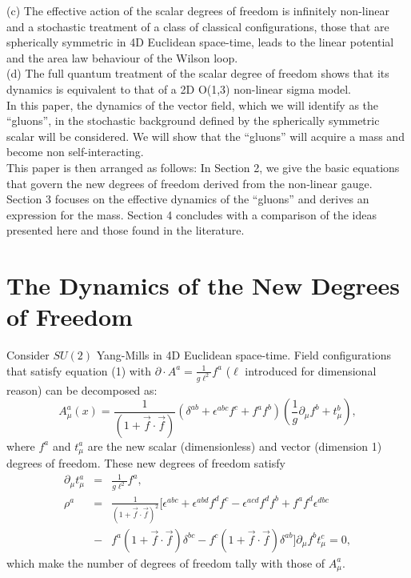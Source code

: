\documentclass[a4paper,12pt]{article}
\begin{document}
(c) The effective action of the scalar degrees of freedom is infinitely non-linear and a stochastic treatment of a class of classical configurations, those that are spherically symmetric in 4D Euclidean space-time, leads to the linear potential and the area law behaviour of the Wilson loop\cite{mass}.\\

(d) The full quantum treatment of the scalar degree of freedom shows that its dynamics is equivalent to that of a 2D O(1,3) non-linear sigma model\cite{free}.\\

In this paper, the dynamics of the vector field, which we will identify as the ``gluons'', in the stochastic background defined by the spherically symmetric scalar will be considered.  We will show that the ``gluons'' will acquire a mass and become non self-interacting.\\

This paper is then arranged as follows:  In Section 2, we give the basic equations that govern the new degrees of freedom derived from the non-linear gauge.  Section 3 focuses on the effective dynamics of the ``gluons'' and derives an expression for the mass.  Section 4 concludes with a comparison of the ideas presented here and those found in the literature.

\section{The Dynamics of the New Degrees of Freedom}

Consider $SU(2)$ Yang-Mills in 4D Euclidean space-time.  Field configurations that satisfy equation (1) with $\partial\cdot A^{a}=\frac{1}{g\ell^{2}}f^{a}$ ($\ell$ introduced for dimensional reason) can be decomposed as:
\begin{equation}\label{2}
A^{a}_{\mu}(x)=\frac{1}{(1+\vec{f}\cdot\vec{f})}(\delta^{ab}+\epsilon^{abc}f^{c}+f^{a}f^{b})(\frac{1}{g}\partial_{\mu}f^{b}+t^{b}_{\mu}),
\end{equation}
where $f^{a}$ and $t^{a}_{\mu}$ are the new scalar (dimensionless) and vector (dimension 1) degrees of freedom.  These new degrees of freedom satisfy
\begin{eqnarray}\label{3}
\partial_{\mu}t^{a}_{\mu}&=&\frac{1}{g\ell^{2}}f^{a},\\
\rho^{a}&=&\frac{1}{(1+\vec{f}\cdot\vec{f})^{2}}[\epsilon^{abc}+\epsilon^{abd}f^{d}f^{c}-\epsilon^{acd}f^{d}f^{b}+f^{a}f^{d}\epsilon^{dbc}\nonumber\\
&-&f^{a}(1+\vec{f}\cdot\vec{f})\delta^{bc}-f^{c}(1+\vec{f}\cdot\vec{f})\delta^{ab}]\partial_{\mu}f^{b}t^{c}_{\mu}=0,
\end{eqnarray}
which make the number of degrees of freedom tally with those of $A^{a}_{\mu}$.\\
\end{document}
